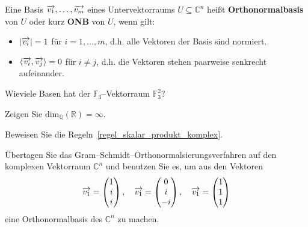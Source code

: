 \begin{definition} Eine Basis $\overrightarrow{v_1}, \ldots, \overrightarrow{v_m}$ eines Untervektorraums $U \subseteq \mathbb C^n$ heißt \textbf{Orthonormalbasis} von 
$U$ oder kurz \textbf{ONB} von $U$, wenn gilt:

\begin{itemize}
\item $\vert \overrightarrow{v_i} \vert = 1$ für $i = 1, \ldots, m$, d.h. alle 
Vektoren der Basis sind normiert.
\item $\langle \overrightarrow{v_i}, \overrightarrow{v_j} \rangle = 0$ für 
$i \neq j$, d.h. die Vektoren stehen paarweise senkrecht aufeinander.
\end{itemize}
\end{definition}


\bigbreak


\begin{aufgabe} Wieviele Basen hat der $\mathbb F_3$--Vektorraum 
$\mathbb F_3^2$?
\end{aufgabe} 

\begin{aufgabe} Zeigen Sie $\textrm{dim}_{\mathbb Q}(\mathbb R) = \infty$.
\end{aufgabe}

\begin{aufgabe} Beweisen Sie die Regeln~\ref{regel_skalar_produkt_komplex}.
\end{aufgabe}

\begin{aufgabe} Übertagen Sie das Gram--Schmidt--Orthonormalsierungs\-ver\-fah\-ren auf 
den komplexen Vektorraum $\mathbb C^n$ und benutzen Sie es, um aus den Vektoren 
  $$ \overrightarrow{v_1} = \left( \begin{matrix} 1 \\ i \\ i \end{matrix} \right), 
  \quad \overrightarrow{v_1} = \left( \begin{matrix} 0 \\ i \\ -i \end{matrix} \right),
  \quad \overrightarrow{v_1} = \left( \begin{matrix} 1 \\ 1 \\ 1 \end{matrix} \right) $$
eine Orthonormalbasis des $\mathbb C^n$ zu machen.
\end{aufgabe}
